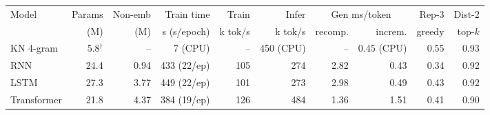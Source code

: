 \begin{tabular}{lrrrrrrrrr}
\toprule
Model & Params & Non-emb & Train time & Train & Infer & \multicolumn{2}{c}{Gen ms/token} & Rep-3 & Dist-2 \\
 & (M) & (M) & s (s/epoch) & k tok/s & k tok/s & recomp. & increm. & greedy & top-$k$ \\
\midrule
KN 4-gram & 5.8$^\dagger$ & -- & 7 (CPU) & -- & 450 (CPU) & -- & 0.45 (CPU) & 0.55 & 0.93 \\
RNN & 24.4 & 0.94 & 433 (22/ep) & 105 & 274 & 2.82 & 0.43 & 0.34 & 0.92 \\
LSTM & 27.3 & 3.77 & 449 (22/ep) & 101 & 273 & 2.98 & 0.49 & 0.43 & 0.92 \\
Transformer & 21.8 & 4.37 & 384 (19/ep) & 126 & 484 & 1.36 & 1.51 & 0.41 & 0.90 \\
\bottomrule
\end{tabular}
